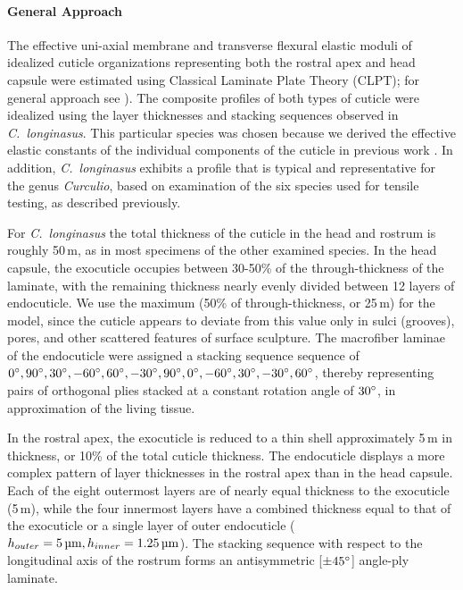 \documentclass[twocolumn, linenumbers, superscriptaddress, nofootinbib]{revtex4-1}
\begin{document}
			\paragraph*{General Approach}
				The effective uni-axial membrane and transverse flexural elastic moduli of idealized cuticle organizations representing both the rostral apex and head capsule were estimated using Classical Laminate Plate Theory (CLPT); for general approach see \cite{Jones2014, Reddy2004}).
				The composite profiles of both types of cuticle were idealized using the layer thicknesses and stacking sequences observed in \textit{C.~longinasus}.
				This particular species was chosen because we derived the effective elastic constants of the individual components of the cuticle in previous work \cite{Jansen2016, Singh2016}.
				In addition, \textit{C.~longinasus} exhibits a profile that is typical and representative for the genus \textit{Curculio}, based on examination of the six species used for tensile testing, as described previously.
				
				For \textit{C.~longinasus} the total thickness of the cuticle in the head and rostrum is roughly 50\,{\textmu}m, as in most specimens of the other examined species.
				In the head capsule, the exocuticle occupies between 30-50\% of the through-thickness of the laminate, with the remaining thickness nearly evenly divided between 12 layers of endocuticle.
				We use the maximum (50\% of through-thickness, or 25\,{\textmu}m) for the model, since the cuticle appears to deviate from this value only in sulci (grooves), pores, and other scattered features of surface sculpture.
				The macrofiber laminae of the endocuticle were assigned a stacking sequence sequence of $0\degree, 90\degree, 30\degree, -60\degree, 60\degree, -30\degree, 90\degree, 0\degree, -60\degree, 30\degree, -30\degree, 60\degree$, thereby representing pairs of orthogonal plies stacked at a constant rotation angle of $30\degree$, in approximation of the living tissue.
				
				In the rostral apex, the exocuticle is reduced to a thin shell approximately 5\,{\textmu}m in thickness, or 10\% of the total cuticle thickness.
				The endocuticle displays a more complex pattern of layer thicknesses in the rostral apex than in the head capsule.
				Each of the eight outermost layers are of nearly equal thickness to the exocuticle (5\,{\textmu}m), while the four innermost layers have a combined thickness equal to that of the exocuticle or a single layer of outer endocuticle ($h_{outer}=5\,\text{{\textmu}m}, h_{inner}=1.25\,\text{{\textmu}m}$).
				The stacking sequence with respect to the longitudinal axis of the rostrum forms an antisymmetric [$\pm45\degree$] angle-ply laminate.
				
\end{document}
